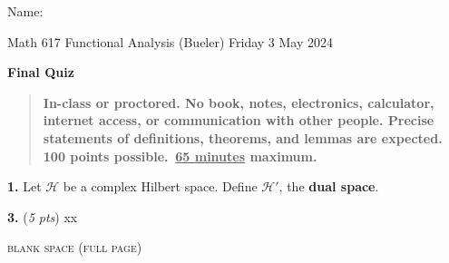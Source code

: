 \documentclass[12pt]{amsart}
\newcommand{\cH}{\mathcal{H}}
\newcommand{\prob}[1]{\bigskip\noindent\textbf{#1.} }
\newcommand{\pts}[1]{(\emph{#1 pts})}
\newcommand{\probpts}[2]{\prob{#1} \pts{#2} \quad}
\begin{document}
\hfill \Large Name:\underline{\phantom{Ed Bueler really really long long long name}}
\medskip

\scriptsize \noindent Math 617 Functional Analysis (Bueler) \hfill Friday 3 May 2024
\medskip

\LARGE\centerline{\textbf{Final Quiz}}

\normalsize
\smallskip
\begin{quote}
\textbf{In-class or proctored.  No book, notes, electronics, calculator, internet access, or communication with other people.  Precise statements of definitions, theorems, and lemmas are expected.  100 points possible. \,\underline{65 minutes} maximum.}
\end{quote}

\normalsize
\medskip

\thispagestyle{empty}

\prob{1}  Let $\cH$ be a complex Hilbert space.  Define $\cH'$, the \textbf{dual space}.
\vfill


\clearpage\newpage
\probpts{3}{5}  xx

\clearpage
\newpage
\thispagestyle{empty}
\begin{center}
\small
\textsc{blank space (full page)}
\end{center}
\vfill
\end{document}
